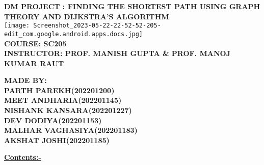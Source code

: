 \documentclass[23pt]{article}
\begin{document}
\fancyhead{} %
\date{ }
\begin{center}
\huge \textbf{DM PROJECT : FINDING THE SHORTEST PATH USING GRAPH THEORY AND DIJKSTRA'S ALGORITHM} \\          
\texttt{[image: Screenshot\_2023-05-22-22-52-52-205-edit\_com.google.android.apps.docs.jpg]} \\
\Large
\textbf{COURSE: SC205}\\
\textbf{INSTRUCTOR: PROF. MANISH GUPTA & PROF. MANOJ KUMAR RAUT}

\textbf{
MADE BY:\\
PARTH PAREKH(202201200)\\
MEET ANDHARIA(202201145)\\
NISHANK KANSARA(202201227)\\
DEV DODIYA(202201153)\\
MALHAR VAGHASIYA(202201183)\\
AKSHAT JOSHI(202201185)\\
}
\end{center}
\newpage
\begin{center}
\centering  \item \textbf{\huge\underline{Contents:-}} 
\end{center}

\section*{\hyperlink{target:Description}{\textcolor{blue}
{\underline{}}}}\label{sec:Description}

\section*{\hyperlink{target:Graph Theory}{\textcolor{blue}
{\underline{}}}}\label{sec:Graph Theory}
\\

\section*{\hyperlink{target:Formulation}{\textcolor{blue}
{\underline{}}}}\label{sec:Formulation}
\end{document}
